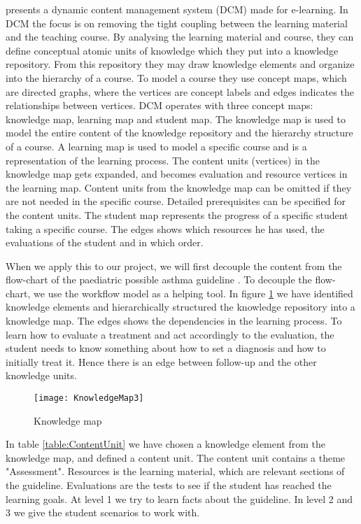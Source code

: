 \textcite{Eide2008} presents a dynamic content management system (DCM) made for e-learning. In DCM the focus is on removing the tight coupling between the learning material and the teaching course. By analysing the learning material and course, they can define conceptual atomic units of knowledge which they put into a knowledge repository. From this repository they may draw knowledge elements and organize into the hierarchy of a course. To model a course they use concept maps, which are directed graphs, where the vertices are concept labels and edges indicates the relationships between vertices. DCM operates with three concept maps: knowledge map, learning map and student map. The knowledge map is used to model the entire content of the knowledge repository and the hierarchy structure of a course. A learning map is used to model a specific course and is a representation of the learning process. The content units (vertices) in the knowledge map gets expanded, and becomes evaluation and resource vertices in the learning map. Content units from the knowledge map can be omitted if they are not needed in the specific course. Detailed prerequisites can be specified for the content units. The student map represents the progress of a specific student taking a specific course. The edges shows which resources he has used, the evaluations of the student and in which order. 


When we apply this to our project, we will first decouple the content from the flow-chart of the paediatric possible asthma guideline \parencite{RepublicofKeny2016}. To decouple the flow-chart, we use the workflow model as a helping tool. In figure \ref{fig:KnowledgeMap} we have identified knowledge elements and hierarchically structured the knowledge repository into a knowledge map. The edges shows the dependencies in the learning process. To learn how to evaluate a treatment and act accordingly to the evaluation, the student needs to know something about how to set a diagnosis and how to initially treat it. Hence there is an edge between follow-up and the other knowledge units.

\begin{figure}[h!]
	\caption {Knowledge map}
	\label{fig:KnowledgeMap}
	\texttt{[image: KnowledgeMap3]}
\end{figure}

In table \ref{table:ContentUnit} we have chosen a knowledge element from the knowledge map, and defined a content unit. The content unit contains a theme "Assessment". Resources is the learning material, which are relevant sections of the guideline. Evaluations are the tests to see if the student has reached the learning goals. At level 1 we try to learn facts about the guideline. In level 2 and 3 we give the student scenarios to work with.

